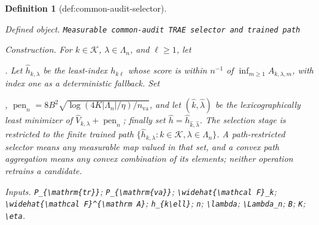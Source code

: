 \documentclass{article}
\newtheorem{definition}{Definition}
\begin{document}
\begin{definition}[def:common-audit-selector]\label{def:common-audit-selector}
\par\smallskip\noindent\emph{Defined object.} \texttt{Measurable common-\allowbreak{}audit TRAE selector and trained path}
\par\smallskip\noindent\emph{Construction.} For \(k\in\mathcal K\), \(\lambda\in\Lambda_n\), and \(\ell\ge1\), let \par\noindent {}\par\noindent. Let \(\widehat h_{k,\lambda}\) be the least-index \(h_{k\ell}\) whose score is within \(n^{-1}\) of \(\inf_{m\ge1}A_{k,\lambda,m}\), with index one as a deterministic fallback. Set \par\noindent {}\par\noindent, \(\operatorname{pen}_n=8B^2\sqrt{\log(4K|\Lambda_n|/\eta)/n_{\mathrm{va}}}\), and let \((\widehat k,\widehat\lambda)\) be the lexicographically least minimizer of \(\widehat V_{k,\lambda}+\operatorname{pen}_n\); finally set \(\widehat h=\widehat h_{\widehat k,\widehat\lambda}\). The selection stage is restricted to the finite trained path \(\{\widehat h_{k,\lambda}:k\in\mathcal K,\lambda\in\Lambda_n\}\). A path-restricted selector means any measurable map valued in that set, and a convex path aggregation means any convex combination of its elements; neither operation retrains a candidate.
\par\smallskip\noindent\emph{Inputs.} \texttt{P\_\allowbreak{}\{\textbackslash{}\allowbreak{}mathrm\{tr\}\allowbreak{}\}\allowbreak{}}; \texttt{P\_\allowbreak{}\{\textbackslash{}\allowbreak{}mathrm\{va\}\allowbreak{}\}\allowbreak{}}; \texttt{\textbackslash{}\allowbreak{}widehat\{\textbackslash{}\allowbreak{}mathcal F\}\allowbreak{}\_\allowbreak{}k}; \texttt{\textbackslash{}\allowbreak{}widehat\{\textbackslash{}\allowbreak{}mathcal F\}\allowbreak{}\textasciicircum{}\{\textbackslash{}\allowbreak{}mathrm A\}\allowbreak{}}; \texttt{h\_\allowbreak{}\{k\textbackslash{}\allowbreak{}ell\}\allowbreak{}}; \texttt{n}; \texttt{\textbackslash{}\allowbreak{}lambda}; \texttt{\textbackslash{}\allowbreak{}Lambda\_\allowbreak{}n}; \texttt{B}; \texttt{K}; \texttt{\textbackslash{}\allowbreak{}eta}.
\end{definition}
\end{document}
